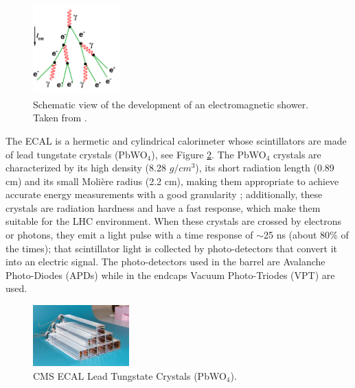 \begin{figure}[ht]
    \begin{center}
      \includegraphics[width=0.3\textwidth]{figuras/Chapter2/ElectroCascade.png}
      \caption{Schematic view of the development of an electromagnetic shower. Taken from \cite{EMFigure}.
      } \label{figchp2:EMshower}
    \end{center}
 \end{figure}

\noindent The ECAL is a hermetic and cylindrical calorimeter whose scintillators are made of 
lead tungstate crystals (PbWO$_{4}$), see Figure \ref{figchp2:ECALcrytal}. The PbWO$_{4}$ crystals are
characterized by its high density (8.28 $g/cm^{3}$), its short radiation length (0.89 cm) and its
small Moli\`ere radius (2.2 cm), making them appropriate to achieve 
accurate energy measurements with a good granularity \cite{chp2:CMS}; additionally,
these crystals are radiation hardness and have a fast response, which make them
suitable for the LHC environment. When these crystals are crossed by electrons 
or photons, they emit a light pulse with a time response of $\sim$25 ns (about 80$\%$ of the times); that scintillator
light is collected by photo-detectors that convert it into an electric signal. The photo-detectors used in the barrel 
are Avalanche Photo-Diodes (APDs) while in the endcaps Vacuum Photo-Triodes (VPT) are used. \\

\begin{figure}[ht]
    \begin{center}
      \includegraphics[width=0.33\textwidth]{figuras/Chapter2/ECALcrytal.jpg}
      \caption{CMS ECAL Lead Tungstate Crystals (PbWO$_{4}$).
      } \label{figchp2:ECALcrytal}
    \end{center}
 \end{figure}
 
